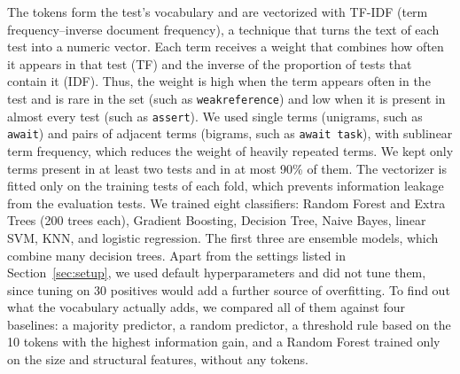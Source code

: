  The tokens form the test's vocabulary and are vectorized with TF-IDF (term frequency--inverse document frequency), a technique that turns the text of each test into a numeric vector. Each term receives a weight that combines how often it appears in that test (TF) and the inverse of the proportion of tests that contain it (IDF). Thus, the weight is high when the term appears often in the test and is rare in the set (such as \texttt{weakreference}) and low when it is present in almost every test (such as \texttt{assert}). We used single terms (unigrams, such as \texttt{await}) and pairs of adjacent terms (bigrams, such as \texttt{await task}), with sublinear term frequency, which reduces the weight of heavily repeated terms. We kept only terms present in at least two tests and in at most 90\% of them. The vectorizer is fitted only on the training tests of each fold, which prevents information leakage from the evaluation tests.  We trained eight classifiers: Random Forest and Extra Trees (200 trees each), Gradient Boosting, Decision Tree, Naive Bayes, linear SVM, KNN, and logistic regression.  The first three are ensemble models, which combine many decision trees. Apart from the settings listed in Section~\ref{sec:setup}, we used default hyperparameters and did not tune them, since tuning on 30 positives would add a further source of overfitting. To find out what the vocabulary actually adds, we compared all of them against four baselines: a majority predictor, a random predictor, a threshold rule based on the 10 tokens with the highest information gain,  and a Random Forest trained only on the size and structural features, without any tokens.

